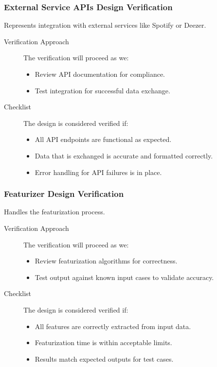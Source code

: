 \documentclass[12pt, titlepage]{article}
\begin{document}
\subsubsection{External Service APIs Design Verification}
Represents integration with external services like Spotify or Deezer.
\begin{description}
  \item[Verification Approach] The verification will proceed as we:
  \begin{itemize}[leftmargin=0cm]
    \item Review API documentation for compliance.
    \item Test integration for successful data exchange.
  \end{itemize}
  \item[Checklist] The design is considered verified if:
    \begin{itemize}[label=$\square$,leftmargin=0cm]
    \item All API endpoints are functional as expected.
    \item Data that is exchanged is accurate and formatted correctly.
    \item Error handling for API failures is in place.
  \end{itemize}
\end{description}

\subsubsection{Featurizer Design Verification}
Handles the featurization process.
\begin{description}
  \item[Verification Approach] The verification will proceed as we:
  \begin{itemize}[leftmargin=0cm]
    \item Review featurization algorithms for correctness.
    \item Test output against known input cases to validate accuracy.
  \end{itemize}
  \item[Checklist] The design is considered verified if:
    \begin{itemize}[label=$\square$,leftmargin=0cm]
    \item All features are correctly extracted from input data.
    \item Featurization time is within acceptable limits.
    \item Results match expected outputs for test cases.
  \end{itemize}
\end{description}
\end{document}
